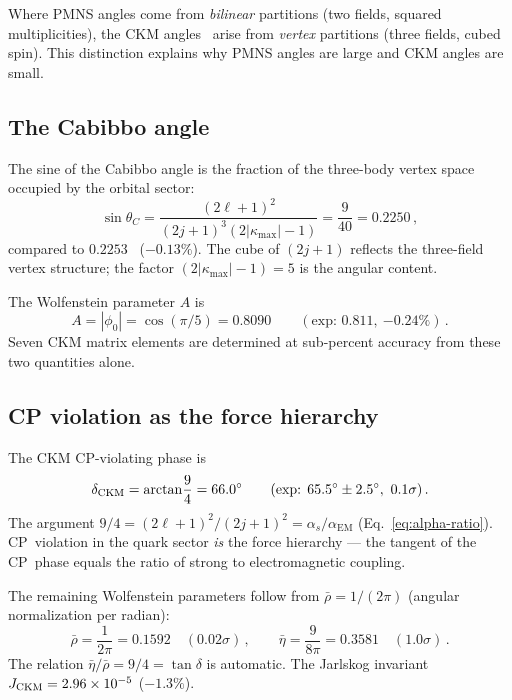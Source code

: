 \documentclass[aps,prd,twocolumn,superscriptaddress,nofootinbib,longbibliography]{revtex4-2}
\newcommand{\phiz}{\phi_0}
\newcommand{\kmax}{|\kappa_{\mathrm{max}}|}
\newcommand{\aEM}{\alpha_{\mathrm{EM}}}
\begin{document}
Where PMNS angles come from \emph{bilinear} partitions (two fields,
squared multiplicities), the CKM angles~\cite{Cabibbo1963,KobayashiMaskawa1973} arise from \emph{vertex}
partitions (three fields, cubed spin).  This distinction explains why
PMNS angles are large and CKM angles are small.

\subsection{The Cabibbo angle}

The sine of the Cabibbo angle is the fraction of the three-body vertex
space occupied by the orbital sector:
\begin{equation}\label{eq:cabibbo}
  \sin\theta_C = \frac{(2\ell+1)^2}{(2j+1)^3(2\kmax-1)}
  = \frac{9}{40} = 0.2250\,,
\end{equation}
compared to $0.2253$~\cite{CKMfitter2021} ($-0.13\%$).  The cube of $(2j+1)$ reflects the
three-field vertex structure; the factor $(2\kmax - 1) = 5$ is the
angular content.

The Wolfenstein parameter $A$ is
\begin{equation}\label{eq:wolfenstein}
  A = |\phiz| = \cos(\pi/5) = 0.8090
  \qquad(\text{exp: }0.811,\ {-0.24\%})\,.
\end{equation}
Seven CKM matrix elements are determined at sub-percent accuracy from
these two quantities alone.

\subsection{CP violation as the force hierarchy}

The CKM CP-violating phase is
\begin{equation}\label{eq:delta-ckm}
  \delta_{\rm CKM} = \arctan\!\frac{9}{4}
  = 66.0^\circ
  \qquad(\text{exp: }65.5^\circ \pm 2.5^\circ,\ 0.1\sigma)\,.
\end{equation}
The argument $9/4 = (2\ell+1)^2/(2j+1)^2 = \alpha_s/\aEM$
(Eq.~\ref{eq:alpha-ratio}).  CP~violation in the quark sector
\emph{is} the force hierarchy --- the tangent of the CP~phase equals
the ratio of strong to electromagnetic coupling.

The remaining Wolfenstein parameters follow from $\bar\rho = 1/(2\pi)$
(angular normalization per radian):
\begin{equation}
  \bar\rho = \frac{1}{2\pi} = 0.1592
  \quad(0.02\sigma)\,,
  \qquad
  \bar\eta = \frac{9}{8\pi} = 0.3581
  \quad(1.0\sigma)\,.
\end{equation}
The relation $\bar\eta/\bar\rho = 9/4 = \tan\delta$ is automatic.
The Jarlskog invariant
$J_{\rm CKM} = 2.96 \times 10^{-5}$ ($-1.3\%$).
\end{document}

